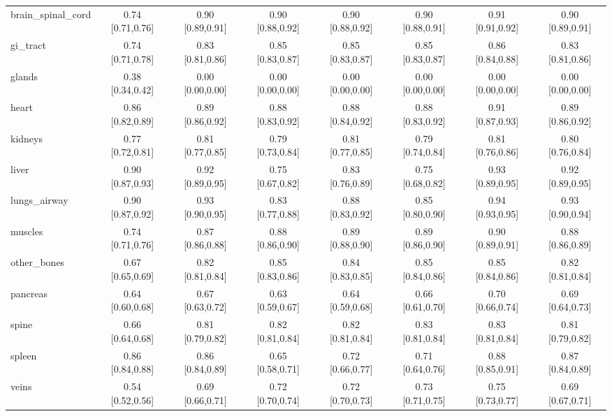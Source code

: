\begin{tabular}{lccccccc}
brain\_spinal\_cord & 0.74 [0.71,0.76] & 0.90 [0.89,0.91] & 0.90 [0.88,0.92] & 0.90 [0.88,0.92] & 0.90 [0.88,0.91] & 0.91 [0.91,0.92] & 0.90 [0.89,0.91] \\
gi\_tract & 0.74 [0.71,0.78] & 0.83 [0.81,0.86] & 0.85 [0.83,0.87] & 0.85 [0.83,0.87] & 0.85 [0.83,0.87] & 0.86 [0.84,0.88] & 0.83 [0.81,0.86] \\
glands & 0.38 [0.34,0.42] & 0.00 [0.00,0.00] & 0.00 [0.00,0.00] & 0.00 [0.00,0.00] & 0.00 [0.00,0.00] & 0.00 [0.00,0.00] & 0.00 [0.00,0.00] \\
heart & 0.86 [0.82,0.89] & 0.89 [0.86,0.92] & 0.88 [0.83,0.92] & 0.88 [0.84,0.92] & 0.88 [0.83,0.92] & 0.91 [0.87,0.93] & 0.89 [0.86,0.92] \\
kidneys & 0.77 [0.72,0.81] & 0.81 [0.77,0.85] & 0.79 [0.73,0.84] & 0.81 [0.77,0.85] & 0.79 [0.74,0.84] & 0.81 [0.76,0.86] & 0.80 [0.76,0.84] \\
liver & 0.90 [0.87,0.93] & 0.92 [0.89,0.95] & 0.75 [0.67,0.82] & 0.83 [0.76,0.89] & 0.75 [0.68,0.82] & 0.93 [0.89,0.95] & 0.92 [0.89,0.95] \\
lungs\_airway & 0.90 [0.87,0.92] & 0.93 [0.90,0.95] & 0.83 [0.77,0.88] & 0.88 [0.83,0.92] & 0.85 [0.80,0.90] & 0.94 [0.93,0.95] & 0.93 [0.90,0.94] \\
muscles & 0.74 [0.71,0.76] & 0.87 [0.86,0.88] & 0.88 [0.86,0.90] & 0.89 [0.88,0.90] & 0.89 [0.86,0.90] & 0.90 [0.89,0.91] & 0.88 [0.86,0.89] \\
other\_bones & 0.67 [0.65,0.69] & 0.82 [0.81,0.84] & 0.85 [0.83,0.86] & 0.84 [0.83,0.85] & 0.85 [0.84,0.86] & 0.85 [0.84,0.86] & 0.82 [0.81,0.84] \\
pancreas & 0.64 [0.60,0.68] & 0.67 [0.63,0.72] & 0.63 [0.59,0.67] & 0.64 [0.59,0.68] & 0.66 [0.61,0.70] & 0.70 [0.66,0.74] & 0.69 [0.64,0.73] \\
spine & 0.66 [0.64,0.68] & 0.81 [0.79,0.82] & 0.82 [0.81,0.84] & 0.82 [0.81,0.84] & 0.83 [0.81,0.84] & 0.83 [0.81,0.84] & 0.81 [0.79,0.82] \\
spleen & 0.86 [0.84,0.88] & 0.86 [0.84,0.89] & 0.65 [0.58,0.71] & 0.72 [0.66,0.77] & 0.71 [0.64,0.76] & 0.88 [0.85,0.91] & 0.87 [0.84,0.89] \\
veins & 0.54 [0.52,0.56] & 0.69 [0.66,0.71] & 0.72 [0.70,0.74] & 0.72 [0.70,0.73] & 0.73 [0.71,0.75] & 0.75 [0.73,0.77] & 0.69 [0.67,0.71] \\
\bottomrule
\end{tabular}
